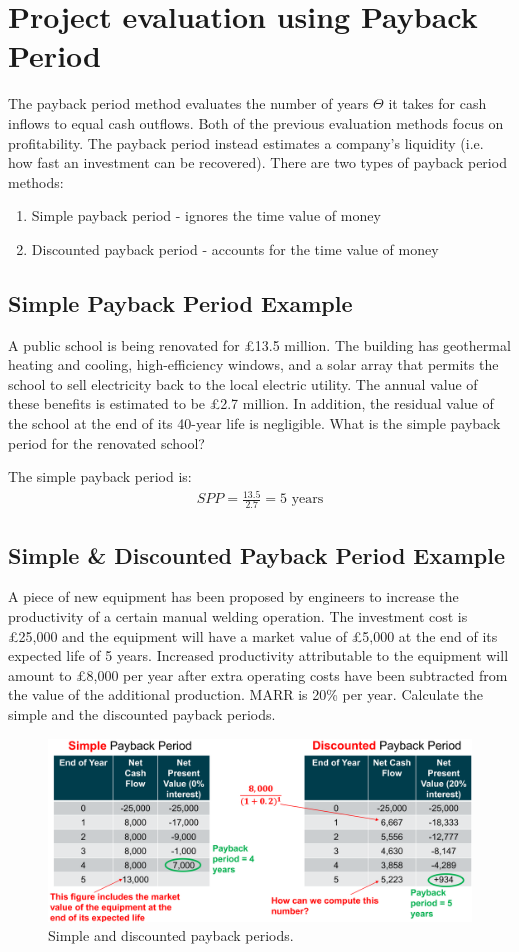 \section{Project evaluation using Payback Period}
The payback period method evaluates the number of years $\Theta$ it takes for cash inflows to equal cash outflows. Both of the previous evaluation methods focus on profitability. The payback period instead estimates a company's liquidity (i.e. how fast an investment can be recovered). There are two types of payback period methods:
\begin{enumerate}
  \item Simple payback period - ignores the time value of money
  \item Discounted payback period - accounts for the time value of money
\end{enumerate}
\subsection{Simple Payback Period Example}
A public school is being renovated for £13.5 million. The building has geothermal heating and cooling, high-efficiency windows, and a solar array that permits the school to sell electricity back to the local electric utility. The annual value of these benefits is estimated to be £2.7 million. In addition, the residual value of the school at the end of its 40-year life is negligible. What is the simple payback period for the renovated school?

The simple payback period is:
\begin{gather}
  SPP = \frac{13.5}{2.7} = 5 \textrm{ years}
\end{gather}
\subsection{Simple \& Discounted Payback Period Example}
A piece of new equipment has been proposed by engineers to increase the productivity of a certain manual welding operation. The investment cost is £25,000 and the equipment will have a market value of £5,000 at the end of its expected life of 5 years. Increased productivity attributable to the equipment will amount to £8,000 per year after extra operating costs have been subtracted from the value of the additional production. MARR is 20\% per year. Calculate the simple and the discounted payback periods.
\begin{figure}[H]
  \centering
  \includegraphics[width = \textwidth]{./img/figure24.png}
  \caption{Simple and discounted payback periods.}
\end{figure}
